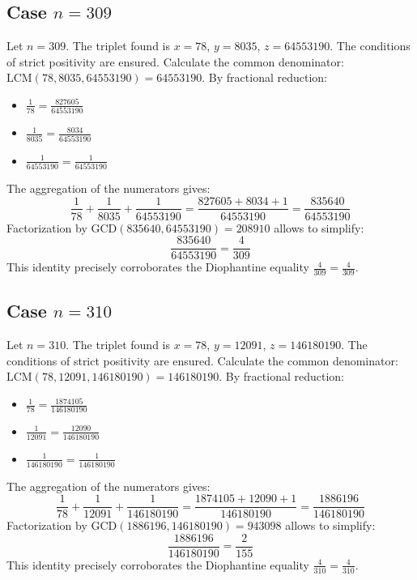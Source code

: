 \documentclass[11pt,a4paper]{article}
\begin{document}
\subsection{Case $n = 309$}
Let $n = 309$. The triplet found is $x = 78$, $y = 8035$, $z = 64553190$.
The conditions of strict positivity are ensured.
Calculate the common denominator: $\text{LCM}(78, 8035, 64553190) = 64553190$.
By fractional reduction:
\begin{itemize}
    \item $\frac{1}{78} = \frac{827605}{64553190}$
    \item $\frac{1}{8035} = \frac{8034}{64553190}$
    \item $\frac{1}{64553190} = \frac{1}{64553190}$
\end{itemize}
The aggregation of the numerators gives:
$$ \frac{1}{78} + \frac{1}{8035} + \frac{1}{64553190} = \frac{827605 + 8034 + 1}{64553190} = \frac{835640}{64553190} $$
Factorization by $\text{GCD}(835640, 64553190) = 208910$ allows to simplify:
$$ \frac{835640}{64553190} = \frac{4}{309} $$
This identity precisely corroborates the Diophantine equality $\frac{4}{309} = \frac{4}{309}$.

\subsection{Case $n = 310$}
Let $n = 310$. The triplet found is $x = 78$, $y = 12091$, $z = 146180190$.
The conditions of strict positivity are ensured.
Calculate the common denominator: $\text{LCM}(78, 12091, 146180190) = 146180190$.
By fractional reduction:
\begin{itemize}
    \item $\frac{1}{78} = \frac{1874105}{146180190}$
    \item $\frac{1}{12091} = \frac{12090}{146180190}$
    \item $\frac{1}{146180190} = \frac{1}{146180190}$
\end{itemize}
The aggregation of the numerators gives:
$$ \frac{1}{78} + \frac{1}{12091} + \frac{1}{146180190} = \frac{1874105 + 12090 + 1}{146180190} = \frac{1886196}{146180190} $$
Factorization by $\text{GCD}(1886196, 146180190) = 943098$ allows to simplify:
$$ \frac{1886196}{146180190} = \frac{2}{155} $$
This identity precisely corroborates the Diophantine equality $\frac{4}{310} = \frac{4}{310}$.
\end{document}
